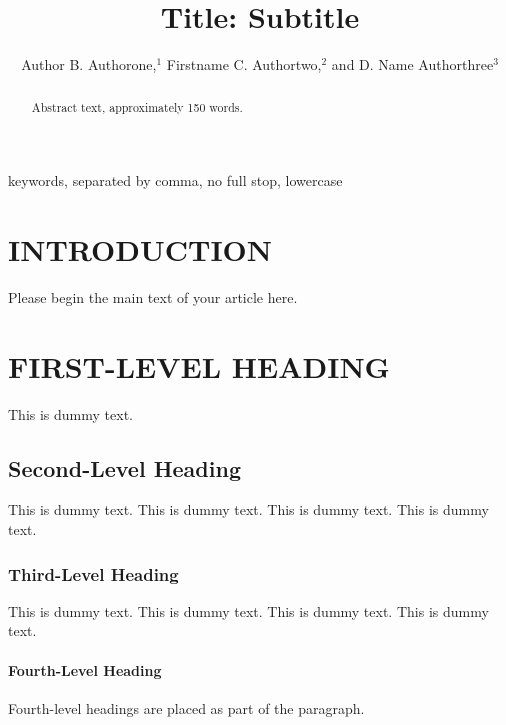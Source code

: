 \documentclass[letterpaper]{ar-1col}
\begin{document}

\title{Title: Subtitle}


\author{Author B. Authorone,$^1$ Firstname C. Authortwo,$^2$ and D. Name Authorthree$^3$
}

\begin{abstract}
Abstract text, approximately 150 words.
\end{abstract}

\begin{keywords}
keywords, separated by comma, no full stop, lowercase
\end{keywords}
\maketitle

\tableofcontents


\section{INTRODUCTION}
Please begin the main text of your article here. 



\section{FIRST-LEVEL HEADING}
This is dummy text. 
\subsection{Second-Level Heading}
This is dummy text. This is dummy text. This is dummy text. This is dummy text.

\subsubsection{Third-Level Heading}
This is dummy text. This is dummy text. This is dummy text. This is dummy text. 

\paragraph{Fourth-Level Heading} Fourth-level headings are placed as part of the paragraph.
\end{document}
